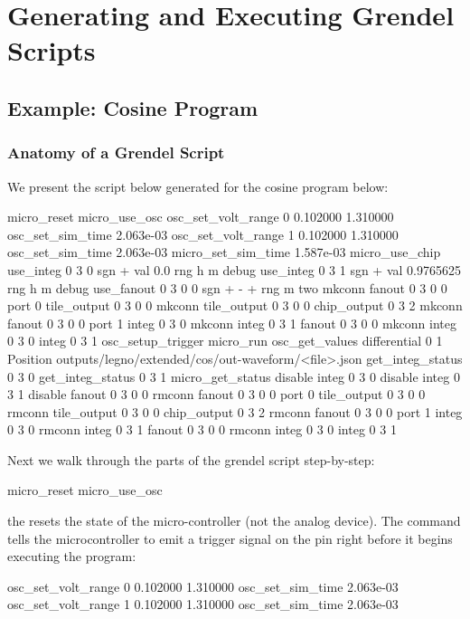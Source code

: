 \chapter{Generating and Executing Grendel Scripts}
\label{sec:grendel}

\section{Example: Cosine Program}

\subsection{Anatomy of a Grendel Script}

\noindent We present the  script below generated for the cosine program
below:


\begin{snippet}
micro_reset
micro_use_osc
osc_set_volt_range 0 0.102000 1.310000
osc_set_sim_time 2.063e-03
osc_set_volt_range 1 0.102000 1.310000
osc_set_sim_time 2.063e-03
micro_set_sim_time 1.587e-03
micro_use_chip
use_integ 0 3 0 sgn + val 0.0 rng h m debug
use_integ 0 3 1 sgn + val 0.9765625 rng h m debug
use_fanout 0 3 0 0  sgn + - + rng m two
mkconn fanout 0 3 0 0 port 0 tile_output 0 3 0 0
mkconn tile_output 0 3 0 0 chip_output 0 3 2
mkconn fanout 0 3 0 0 port 1 integ 0 3 0
mkconn integ 0 3 1 fanout 0 3 0 0
mkconn integ 0 3 0 integ 0 3 1
osc_setup_trigger
micro_run
osc_get_values differential 0 1 Position outputs/legno/extended/cos/out-waveform/<file>.json
get_integ_status 0 3 0
get_integ_status 0 3 1
micro_get_status
disable integ 0 3 0
disable integ 0 3 1
disable fanout 0 3 0 0
rmconn fanout 0 3 0 0 port 0 tile_output 0 3 0 0
rmconn tile_output 0 3 0 0 chip_output 0 3 2
rmconn fanout 0 3 0 0 port 1 integ 0 3 0
rmconn integ 0 3 1 fanout 0 3 0 0
rmconn integ 0 3 0 integ 0 3 1
\end{snippet}

\noindent Next we walk through the parts of the grendel script step-by-step:

\begin{snippet}
micro_reset
micro_use_osc
\end{snippet}

\noindent the  resets the
state of the micro-controller (not the analog device). The 
command tells the microcontroller to emit a trigger signal on the  pin
right before it begins executing the program:

\begin{snippet}
osc_set_volt_range 0 0.102000 1.310000
osc_set_sim_time 2.063e-03
osc_set_volt_range 1 0.102000 1.310000
osc_set_sim_time 2.063e-03
\end{snippet}

